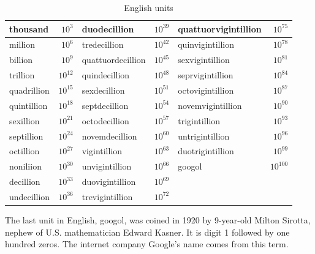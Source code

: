 \documentclass[b5paper]{article}
\begin{document}
\begin{table}[htbp]
  \centering
  \begin{tabular}{|l|r|l|r|l|r|}
  \hline
  thousand & $10^{3}$ & duodecillion  & $10^{39}$ & quattuorvigintillion & $10^{75}$ \\
  \hline
  million & $10^{6}$ & tredecillion  & $10^{42}$ & quinvigintillion & $10^{78}$ \\
  \hline
  billion & $10^{9}$ & quattuordecillion & $10^{45}$ & sexvigintillion & $10^{81}$ \\
  \hline
  trillion  & $10^{12}$ & quindecillion & $10^{48}$ & seprvigintillion & $10^{84}$ \\
  \hline
  quadrillion  & $10^{15}$ & sexdecillion & $10^{51}$ & octovigintillion & $10^{87}$ \\
  \hline
  quintillion  & $10^{18}$ & septdecillion & $10^{54}$ & novemvigintillion & $10^{90}$ \\
  \hline
  sexillion    & $10^{21}$ & octodecillion & $10^{57}$ & trigintillion & $10^{93}$ \\
  \hline
  septillion   & $10^{24}$ & novemdecillion & $10^{60}$ & untrigintillion & $10^{96}$ \\
  \hline
  octillion    & $10^{27}$ & vigintillion & $10^{63}$ & duotrigintillion & $10^{99}$  \\
  \hline
  noniliion  & $10^{30}$ & unvigintillion & $10^{66}$ & googol & $10^{100}$ \\
  \hline
  decillion  & $10^{33}$ & duovigintillion & $10^{69}$ & & \\
  \hline
  undecillion   & $10^{36}$ & trevigintillion & $10^{72}$ & & \\
  \hline
  \end{tabular}
  \caption{English units}
  \label{tab:units-en}
\end{table}

The last unit in English, googol, was coined in 1920 by 9-year-old Milton Sirotta, nephew of U.S. mathematician Edward Kasner. It is digit 1 followed by one hundred zeros. The internet company Google's name comes from this term.
\end{document}
